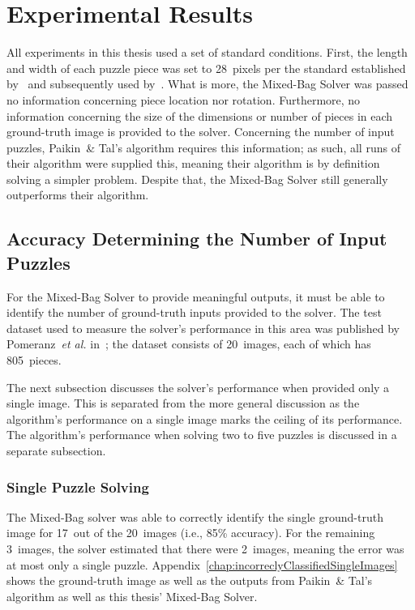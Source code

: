 \chapter{Experimental Results}

All experiments in this thesis used a set of standard conditions.  First, the length and width of each puzzle piece was set to 28~pixels per the standard established by~\cite{cho2010} and subsequently used by~\cite{pomeranz2011, gallagher2012, sholomon2013, paikin2015}. What is more, the Mixed-Bag Solver was passed no information concerning piece location nor rotation.  Furthermore, no information concerning the size of the dimensions or number of pieces in each ground-truth image is provided to the solver.  Concerning the number of input puzzles, Paikin~\& Tal's algorithm requires this information; as such, all runs of their algorithm were supplied this, meaning their algorithm is by definition solving a simpler problem.  Despite that, the Mixed-Bag Solver still generally outperforms their algorithm.

\section{Accuracy Determining the Number of Input Puzzles}

For the Mixed-Bag Solver to provide meaningful outputs, it must be able to identify the number of ground-truth inputs provided to the solver.  The test dataset used to measure the solver's performance in this area was published by Pomeranz~\textit{et al.} in~\cite{pomeranzBenchmarkImages}; the dataset consists of 20~images, each of which has 805~pieces.

The next subsection discusses the solver's performance when provided only a single image.  This is separated from the more general discussion as the algorithm's performance on a single image marks the ceiling of its performance.  The algorithm's performance when solving two to five puzzles is discussed in a separate subsection.

\subsection{Single Puzzle Solving}

The Mixed-Bag solver was able to correctly identify the single ground-truth image for  17~out of the 20~images (i.e., 85\% accuracy).  For the remaining 3~images, the solver estimated that there were 2~images, meaning the error was at most only a single puzzle.  Appendix~\ref{chap:incorreclyClassifiedSingleImages} shows the ground-truth image as well as the outputs from Paikin~\& Tal's algorithm as well as this thesis' Mixed-Bag Solver.  


